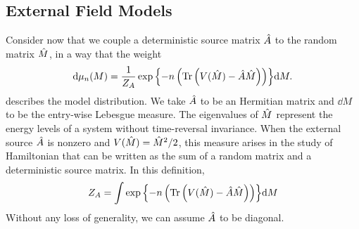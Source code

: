 \subsection{External Field Models}

Consider now that we couple a deterministic source matrix $\hat A$ to the random matrix $\hat M$, in a way that the weight
\begin{equation}
	\mathrm{d} \mu_n(M) = \frac{1}{Z_A} \exp{\left\{-n \left( \operatorname{Tr}{\left(V(\hat M)-  \hat A\hat M \right)}\right)\right\} } \mathrm{d} M.
\end{equation}
describes the model distribution. We take $\hat A$ to be an Hermitian matrix and $\dd M$ to be the entry-wise Lebesgue measure. The eigenvalues of $\hat M$ represent the energy levels of a system without time-reversal invariance. When the external source $\hat A$ is nonzero and $V(\hat M) = \hat M^2 / 2$, this measure arises in the study of Hamiltonian that can be written as the sum of a random matrix and a deterministic source matrix. In this definition,
\begin{equation}
	Z_A = \int  \exp{\left\{-n \left( \operatorname{Tr}{\left(V(\hat M)-  \hat A\hat M \right)}\right)\right\} } \mathrm{d} M
\end{equation}
Without any loss of generality, we can assume $\hat A$ to be diagonal.

